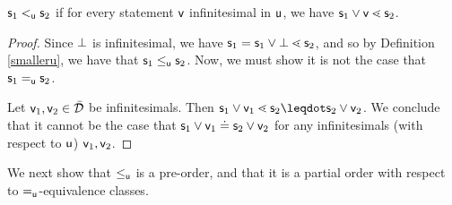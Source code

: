 \documentclass{article}
\begin{document}
 \begin{prop}
$\stmt_1 \leu \stmt_2$ if for every statement $\stmt[v]$ infinitesimal in $\stmt[u]$, we have $\stmt_1\OR\stmt[v] \sfiner \stmt_2$. 
\end{prop}
\begin{proof}
Since $\impossibility$ is infinitesimal, we have $\stmt_1 = \stmt_1\OR\impossibility \sfiner \stmt_2$, and so by Definition \ref{smalleru}, we have that $\stmt_1\lequ\stmt_2$. Now, we must show it is not the case that $\stmt_1\equ \stmt_2$. 

Let $\stmt[v]_1,\stmt[v]_2\in\tdomain$ be infinitesimals. Then $\stmt_1\OR\stmt[v]_1 \sfiner \stmt_2 \finer\stmt_2\OR\stmt[v]_2$. We conclude that it cannot be the case that $\stmt_1 \OR \stmt[v]_1 \eqgran \stmt_2 \OR \stmt[v]_2$ for any infinitesimals (with respect to $\stmt[u]$) $\stmt[v]_1,\stmt[v]_2$. 
\end{proof}

We next show that $\lequ$ is a pre-order, and that it is a partial order with respect to $\equ$-equivalence classes. 
\end{document}
